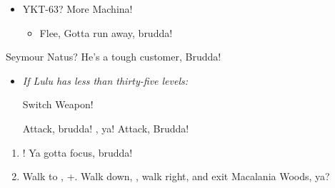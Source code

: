 \begin{encounters}
\begin{itemize}
\item YKT-63? More Machina!
\begin{itemize}
\tidusf Attack, brudda!
\yunaf Attack, ya?
\item Flee, Gotta run away, brudda!
\end{itemize}
\end{itemize}
\end{encounters}
\begin{battle}[36000]{Seymour Natus? He's a tough customer, Brudda!}
\begin{itemize}
\item \textit{If Lulu has less than thirty-five levels:}
\begin{itemize}
\switch{\tidus}{\lulu}
\luluf Switch Weapon!
\switch{\lulu}{\tidus}
\end{itemize}
\tidusf Attack, brudda!
\summon{\bahamut}, ya!
\bahamutf Attack, Brudda!
\end{itemize}
\end{battle}
\begin{enumerate}[resume]
\item \sd! Ya gotta focus, brudda!
\item Walk to \yuna, \cs+\skippablefmv[10:10]. Walk down, \cs[1:40], walk right, and exit Macalania Woods, ya?
\end{enumerate}